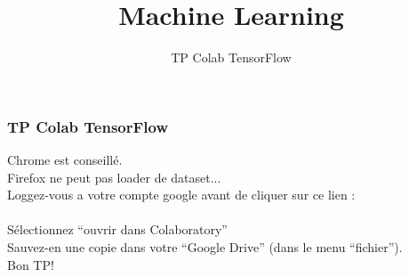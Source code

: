 \documentclass{formation}
\title{Machine Learning}
\subtitle{TP Colab TensorFlow}
\begin{document}
\maketitle

\begin{frame}
  \frametitle{TP Colab TensorFlow}
  \begin{center}
    Chrome est conseillé.\\
    Firefox ne peut pas loader de dataset...\\
    Loggez-vous a votre compte google avant de cliquer sur ce lien :\\
    $\;$\\
    \\
    $\;$\\
    Sélectionnez ``ouvrir dans Colaboratory'' \\
    Sauvez-en une copie dans votre ``Google Drive'' (dans le menu ``fichier'').\\
    $\;$\\
    Bon TP!
  \end{center}
\end{frame}
\end{document}
